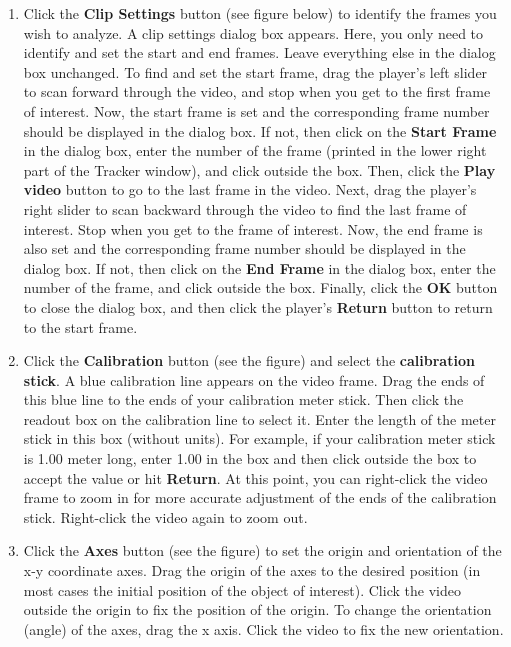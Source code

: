 \begin{enumerate}
\item Click the {\bf Clip Settings} button (see figure below) to identify the frames you wish to analyze. 
A clip settings dialog box appears. 
Here, you only need to identify and set the start and end frames. 
Leave everything else in the dialog box unchanged. 
To find and set the start frame, drag the player's left slider to scan forward through the video, and 
stop when you get to the first frame of interest. 
Now, the start frame is set and the corresponding frame number should be displayed in the dialog box. 
If not, then click on the {\bf Start Frame} in the dialog box, enter the number of the frame 
(printed in the lower right part of the Tracker window), and click outside the box.
Then, click the {\bf Play video} button to go to the last frame in the video. 
Next, drag the player's right slider to scan backward through the video to find the last frame of interest. 
Stop when you get to the frame of interest. Now, the end frame is also set and the corresponding frame number should be displayed in the dialog box. 
If not, then click on the {\bf End Frame} in the dialog box, enter the number of the frame, and click outside the box.
Finally, click the {\bf OK} button to close the dialog box, and then click the player's {\bf Return} button to return to the start frame.

\item Click the {\bf Calibration} button (see the figure) and select the {\bf calibration stick}. 
A blue calibration line appears on the video frame. 
Drag the ends of this blue line to the ends of your calibration meter stick. 
Then click the readout box on the calibration line to select it. 
Enter the length of the meter stick in this box (without units). 
For example, if your calibration meter stick is 1.00 meter long, enter 1.00 in the box 
and then click outside the box to accept the value or hit {\bf Return}. 
At this point, you can right-click the video frame to zoom in for more accurate adjustment of the ends 
of the calibration stick. 
Right-click the video again to zoom out.

\item Click the {\bf Axes} button (see the figure) to set the origin and orientation of the x-y coordinate axes. 
Drag the origin of the axes to the desired position (in most cases the initial position of the object of interest). 
Click the video outside the origin to fix the position of the origin. 
To change the orientation (angle) of the axes, drag the x axis. 
Click the video to fix the new orientation.


\end{enumerate}
